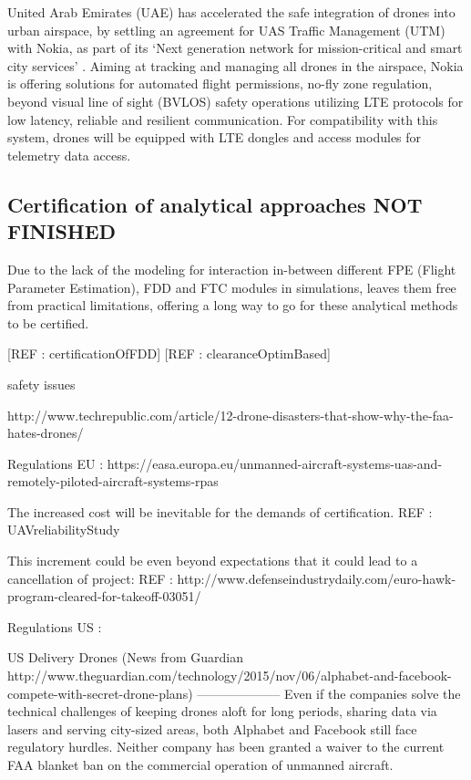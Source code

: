 United Arab Emirates (UAE) has accelerated the safe integration of drones into urban airspace, by settling an agreement for UAS Traffic Management (UTM) with Nokia, as part of its `Next generation network for mission-critical and smart city services' \cite{nokiaDubai}.
Aiming at tracking and managing all drones in the airspace, Nokia is offering solutions for automated flight permissions, no-fly zone regulation, beyond visual line of sight (BVLOS) safety operations utilizing LTE protocols for low latency, reliable and resilient communication. 
For compatibility with this system, drones will be equipped with LTE dongles and access modules for telemetry data access.



\iffalse
\subsection{Certification of analytical approaches NOT FINISHED }\label{ch2:certificationOfAnalyticalApproaches}

Due to the lack of the modeling for interaction in-between different FPE  (Flight Parameter Estimation), FDD and FTC modules in simulations, leaves them free from practical limitations, offering a long way to go for these analytical methods to be certified. 

[REF : certificationOfFDD]
[REF : clearanceOptimBased]


safety issues

http://www.techrepublic.com/article/12-drone-disasters-that-show-why-the-faa-hates-drones/


Regulations EU : https://easa.europa.eu/unmanned-aircraft-systems-uas-and-remotely-piloted-aircraft-systems-rpas

The increased cost will be inevitable for the demands of certification. REF : UAVreliabilityStudy

This increment could be even beyond expectations that it could lead to a cancellation of project:  REF : http://www.defenseindustrydaily.com/euro-hawk-program-cleared-for-takeoff-03051/

Regulations US : 

US Delivery Drones (News from Guardian http://www.theguardian.com/technology/2015/nov/06/alphabet-and-facebook-compete-with-secret-drone-plans)
--------------------
Even if the companies solve the technical challenges of keeping drones aloft for long periods, sharing data via lasers and serving city-sized areas, both Alphabet and Facebook still face regulatory hurdles. Neither company has been granted a waiver to the current FAA blanket ban on the commercial operation of unmanned aircraft.

